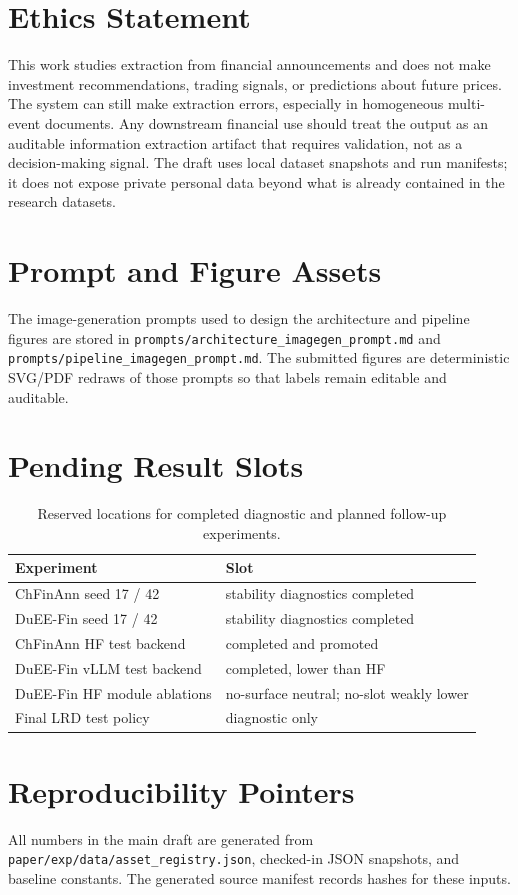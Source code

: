\documentclass[11pt]{article}
\begin{document}
\section{Ethics Statement}

This work studies extraction from financial announcements and does not make investment recommendations, trading signals, or predictions about future prices. The system can still make extraction errors, especially in homogeneous multi-event documents. Any downstream financial use should treat the output as an auditable information extraction artifact that requires validation, not as a decision-making signal. The draft uses local dataset snapshots and run manifests; it does not expose private personal data beyond what is already contained in the research datasets.



\appendix

\section{Prompt and Figure Assets}

The image-generation prompts used to design the architecture and pipeline figures are stored in \texttt{prompts/architecture\_imagegen\_prompt.md} and \texttt{prompts/pipeline\_imagegen\_prompt.md}. The submitted figures are deterministic SVG/PDF redraws of those prompts so that labels remain editable and auditable.

\section{Pending Result Slots}

\begin{table}[h]
\centering
\small
\begin{tabular}{p{}p{}}
\toprule
Experiment & Slot \\
\midrule
ChFinAnn seed 17 / 42 & stability diagnostics completed \\
DuEE-Fin seed 17 / 42 & stability diagnostics completed \\
ChFinAnn HF test backend & completed and promoted \\
DuEE-Fin vLLM test backend & completed, lower than HF \\
DuEE-Fin HF module ablations & no-surface neutral; no-slot weakly lower \\
Final LRD test policy & diagnostic only \\
\bottomrule
\end{tabular}
\caption{Reserved locations for completed diagnostic and planned follow-up experiments.}
\end{table}

\section{Reproducibility Pointers}

All numbers in the main draft are generated from \texttt{paper/exp/data/asset\_registry.json}, checked-in JSON snapshots, and baseline constants. The generated source manifest records hashes for these inputs.
\end{document}
